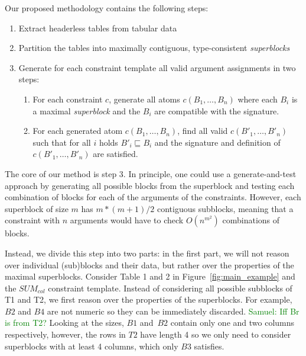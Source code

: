 \documentclass{IEEEtran}
\newcommand{\samuel}[1]{\textcolor{green}{{\sc Samuel:} #1}\xspace}
\theoremstyle{definition}
\begin{document}
Our proposed methodology contains the following steps:
\begin{enumerate}
\item Extract headerless tables from tabular data
\item Partition the tables into maximally contiguous, type-consistent \textit{superblocks}
\item Generate for each constraint template all valid argument assignments in two steps:
\begin{enumerate}
\item For each constraint $c$, generate all atoms $c(B_1, \ldots ,B_n)$ where each $B_i$ is a maximal \textit{superblock} and the $B_i$ are compatible with the signature.
\item For each generated atom $c(B_1, \ldots ,B_n)$, find all valid $c(B'_1, \ldots, B'_n)$ such that for all $i$ holds $B'_i \sqsubseteq B_i$ and the signature and definition of $c(B'_1, \ldots, B'_n)$ are satisfied.
\end{enumerate}
\end{enumerate}

The core of our method is step 3. In principle, one could use a generate-and-test approach by generating all possible blocks from the superblock and testing each combination of blocks for each of the arguments of the constraints. However, each superblock of size $m$ has $m*(m+1)/2$ contiguous subblocks, meaning that a constraint with $n$ arguments would have to check $O(n^{m^2})$ combinations of blocks.

Instead, we divide this step into two parts: in the first part, we will not reason over individual (sub)blocks and their data, but rather over the properties of the maximal superblocks.
Consider Table 1 and 2 in Figure~\ref{fig:main_example} and the $\mathit{SUM}_{col}$ constraint template.
Instead of considering all possible subblocks of T1 and T2, we first reason over the properties of the superblocks.
For example, $B2$ and $B4$ are not numeric so they can be immediately discarded.
\samuel{Iff Br is from T2?}
Looking at the sizes, $B1$ and~$B2$ contain only one and two columns respectively, however, the rows in $T2$ have length 4 so we only need to consider superblocks with at least 4 columns, which only $B3$ satisfies.
\end{document}
